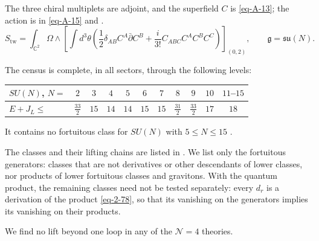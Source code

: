\documentclass[11pt]{article}
\numberwithin{equation}{section}
\numberwithin{figure}{section}
\numberwithin{table}{section}
\begin{document}
The three chiral multiplets are adjoint, and the superfield $C$ is \eqref{eq-A-13}; the action is in \eqref{eq-A-15} and \cite[results report, \S1.1]{Repo}.
\begin{equation}\label{local-ch9-su-action}
S_{\mathrm{tw}}=\int_{\mathbb C^2}\Omega\wedge
\left[\int d^3\theta\left(\frac12\delta_{AB}C^A\bar\partial C^B
+\frac{i}{3!}C_{ABC}C^AC^BC^C\right)\right]_{(0,2)},
\qquad\mathfrak g=\mathfrak{su}(N).
\end{equation}

The census is complete, in all sectors, through the following levels:
\begin{center}
{\small\renewcommand{\arraystretch}{1.3}
\begin{tabular}{|l|c|c|c|c|c|c|c|c|c|c|}
\hline
$SU(N)$, $N=$ & $2$ & $3$ & $4$ & $5$ & $6$ & $7$ & $8$ & $9$ & $10$ & $11$--$15$\\
\hline
$E+J_L\le$ & $\tfrac{33}2$ & $15$ & $14$ & $14$ & $15$ & $15$ & $\tfrac{31}2$ & $\tfrac{33}2$ & $17$ & $18$\\
\hline
\end{tabular}}
\end{center}
It contains no fortuitous class for $SU(N)$ with $5\le N\le15$ \cite[supplement, Section S2.1]{Repo}.

The classes and their lifting chains are listed in \cite[supplement, Sections S2.2 and S2.3]{Repo}. We list only the fortuitous generators: classes that are not derivatives or other descendants of lower classes, nor products of lower fortuitous classes and gravitons. With the quantum product, the remaining classes need not be tested separately: every $d_r$ is a derivation of the product \eqref{eq-2-78}, so that its vanishing on the generators implies its vanishing on their products.

We find no lift beyond one loop in any of the $\mathcal N=4$ theories.
\end{document}
